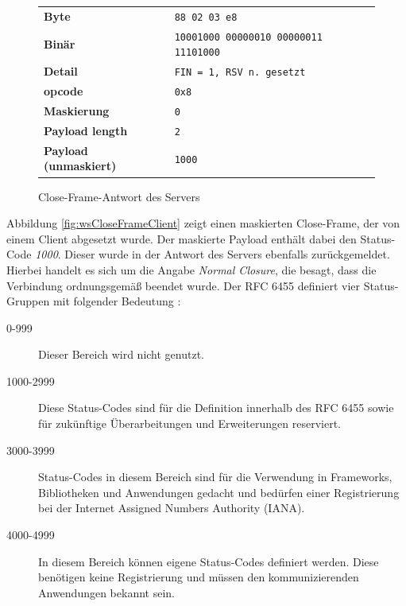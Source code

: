 \documentclass[11pt,a4paper,titlepage]{scrartcl}
\numberwithin{equation}{section}
\begin{document}
\begin{figure}[ht]
	\begin{center}
		\begin{tabular}{l>{\arraybackslash}p{8.0cm}}
			\textbf{Byte} & \texttt{88 02 03 e8} \\
			\textbf{Binär} & \texttt{10001000 00000010 00000011 11101000}\\
			\textbf{Detail} & \texttt{FIN = 1, RSV n. gesetzt} \\
			\textbf{opcode} & \texttt{0x8} \\ 
			\textbf{Maskierung} & \texttt{0}\\ 
			\textbf{Payload length} & \texttt{2}\\ 
			\textbf{Payload (unmaskiert)} & \texttt{1000} \\
		\end{tabular}
	\end{center}
	\caption{Close-Frame-Antwort des Servers}
	\label{fig:wsCloseFrameServer}
\end{figure}

\noindent Abbildung \ref{fig:wsCloseFrameClient} zeigt einen maskierten Close-Frame, der von einem Client abgesetzt wurde. Der maskierte Payload enthält dabei den Status-Code \textit{1000}. Dieser wurde in der Antwort des Servers ebenfalls zurückgemeldet. Hierbei handelt es sich um die Angabe \textit{Normal Closure}, die besagt, dass die Verbindung ordnungsgemäß beendet wurde. Der RFC 6455 definiert vier Status-Gruppen mit folgender Bedeutung \autocite[46]{fette_websocket_2011}:
\begin{description}
	\item[0-999] Dieser Bereich wird nicht genutzt.
	\item[1000-2999] Diese Status-Codes sind für die Definition innerhalb des RFC 6455 sowie für zukünftige Überarbeitungen und Erweiterungen reserviert.
	\item[3000-3999] Status-Codes in diesem Bereich sind für die Verwendung in Frameworks, Bibliotheken und Anwendungen gedacht und bedürfen einer Registrierung bei der Internet Assigned Numbers Authority (IANA).
	\item[4000-4999] In diesem Bereich können eigene Status-Codes definiert werden. Diese benötigen keine Registrierung und müssen den kommunizierenden Anwendungen bekannt sein. 
\end{description}
\end{document}
